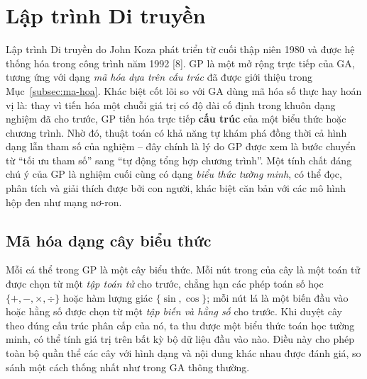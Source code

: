\section{Lập trình Di truyền}
\label{sec:gp}

Lập trình Di truyền do John Koza phát triển
từ cuối thập niên 1980 và được hệ thống hóa trong công trình năm 1992
[8]. GP là một mở rộng trực tiếp của GA, tương ứng với dạng \textit{mã
hóa dựa trên cấu trúc} đã được giới thiệu trong
Mục~\ref{subsec:ma-hoa}. Khác biệt cốt lõi so với GA dùng mã hóa số
thực hay hoán vị là: thay vì tiến hóa một chuỗi giá trị có độ dài cố
định trong khuôn dạng nghiệm đã cho trước, GP tiến hóa trực tiếp
\textbf{cấu trúc} của một biểu thức hoặc chương trình. Nhờ đó, thuật
toán có khả năng tự khám phá đồng thời cả hình dạng lẫn tham số của
nghiệm -- đây chính là lý do GP được xem là bước chuyển từ ``tối ưu
tham số'' sang ``tự động tổng hợp chương trình''. Một tính chất đáng
chú ý của GP là nghiệm cuối cùng có dạng \textit{biểu thức tường minh},
có thể đọc, phân tích và giải thích được bởi con người, khác biệt căn
bản với các mô hình hộp đen như mạng nơ-ron.

\subsection*{Mã hóa dạng cây biểu thức}

Mỗi cá thể trong GP là một cây biểu thức. Mỗi nút trong của cây là một
toán tử được chọn từ một \textit{tập toán tử} cho trước, chẳng hạn các
phép toán số học $\{+,-,\times,\div\}$ hoặc hàm lượng giác
$\{\sin,\cos\}$; mỗi nút lá là một biến đầu vào hoặc hằng số được chọn
từ một \textit{tập biến và hằng số} cho trước. Khi duyệt cây theo đúng
cấu trúc phân cấp của nó, ta thu được một biểu thức toán học tường
minh, có thể tính giá trị trên bất kỳ bộ dữ liệu đầu vào nào. Điều này
cho phép toàn bộ quần thể các cây với hình dạng và nội dung khác nhau
được đánh giá, so sánh một cách thống nhất như trong GA thông thường.

